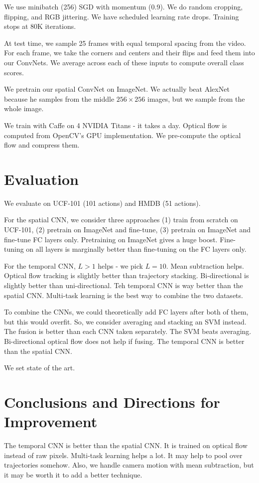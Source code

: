 \documentclass[a4paper]{article}
\begin{document}
We use minibatch (256) SGD with momentum (0.9). We do random cropping, flipping,
and RGB jittering. We have scheduled learning rate drops. Training stops at
80K iterations.

At test time, we sample 25 frames with equal temporal spacing from the
video. For each frame, we take the corners and centers and their flips and
feed them into our ConvNets. We average across each of these inputs to
compute overall class scores.

We pretrain our spatial ConvNet on ImageNet. We actually beat AlexNet because
he samples from the middle $256 \times 256$ images, but we sample from the
whole image.

We train with Caffe on 4 NVIDIA Titans - it takes a day. Optical flow is 
computed from OpenCV's GPU implementation. We pre-compute the optical flow
and compress them.

\section{Evaluation}
We evaluate on UCF-101 (101 actions) and HMDB (51 actions).

For the spatial CNN, we consider three approaches (1) train from scratch on
UCF-101, (2) pretrain on ImageNet and fine-tune, (3) pretrain on ImageNet and
fine-tune FC layers only. Pretraining on ImageNet gives a huge boost.
Fine-tuning on all layers is marginally better than fine-tuning on the FC layers
only.

For the temporal CNN, $L > 1$ helps - we pick $L = 10$. Mean subtraction
helps. Optical flow tracking is slightly better than trajectory stacking.
Bi-directional is slightly better than uni-directional. Teh temporal CNN is
way better than the spatial CNN. Multi-task learning is the best way to 
combine the two datasets.

To combine the CNNs, we could theoretically add FC layers after both of them,
but this would overfit. So, we consider averaging and stacking an SVM instead.
The fusion is better than each CNN taken separately. The SVM beats averaging.
Bi-directional optical flow does not help if fusing. The temporal CNN is better
than the spatial CNN.

We set state of the art.

\section{Conclusions and Directions for Improvement}
The temporal CNN is better than the spatial CNN. It is trained on optical flow
instead of raw pixels. Multi-task learning helps a lot. It may help to
pool over trajectories somehow. Also, we handle camera motion with mean 
subtraction, but it may be worth it to add a better technique.
\end{document}
